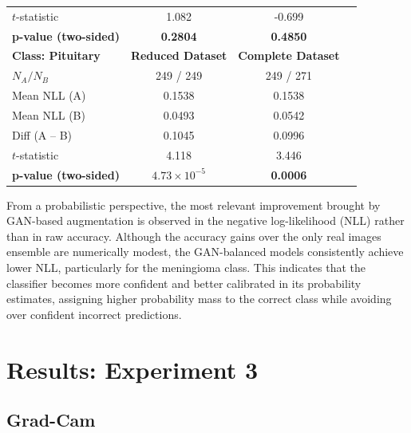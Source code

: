 \begin{table}[ht]
\begin{tabular}{lccc}
$t$-statistic         & 1.082           & -0.699         \\
\textbf{p-value (two-sided)} & \textbf{0.2804} & \textbf{0.4850} \\
\midrule
\textbf{Class: Pituitary} & \textbf{Reduced Dataset} & \textbf{Complete Dataset} \\
$N_A / N_B$           & 249 / 249       & 249 / 271      \\
Mean NLL (A)          & 0.1538          & 0.1538         \\
Mean NLL (B)          & 0.0493          & 0.0542         \\
Diff (A -- B)         & 0.1045          & 0.0996         \\
$t$-statistic         & 4.118           & 3.446          \\
\textbf{p-value (two-sided)} & \textbf{$4.73 \times 10^{-5}$} & \textbf{0.0006} \\
\bottomrule
\end{tabular}
\label{tab:nll_ttest_reduced_complete}
\end{table}

From a probabilistic perspective, the most relevant improvement brought by GAN-based augmentation is observed in the negative log-likelihood (NLL) rather than in raw accuracy. Although the accuracy gains over the only real images ensemble are numerically modest, the GAN-balanced models consistently achieve lower NLL, particularly for the meningioma class. This indicates that the classifier becomes more confident and better calibrated in its probability estimates, assigning higher probability mass to the correct class while avoiding over confident incorrect predictions.


\clearpage




\section{Results: Experiment 3}

\subsection{Grad-Cam}


